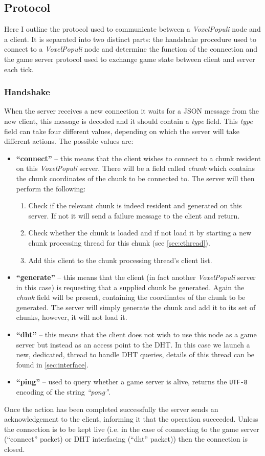 \documentclass[12pt,notitlepage,a4paper]{report}
\newcommand{\voxpop}{\emph{VoxelPopuli}}
\begin{document}
	\subsection{Protocol}
	Here I outline the protocol used to communicate between a \voxpop{} node and a client. It is separated into two distinct parts: the handshake procedure used to connect to a \voxpop{} node and determine the function of the connection and the game server protocol used to exchange game state between client and server each tick.
	\subsubsection{Handshake}
	\label{sec:handshake}
	When the server receives a new connection it waits for a JSON message from the new client, this message is decoded and it should contain a \emph{type} field. This \emph{type} field can take four different values, depending on which the server will take different actions. The possible values are:
	\begin{itemize}
		\item \textbf{``connect''} -- this means that the client wishes to connect to a chunk resident on this \voxpop{} server. There will be a field called \emph{chunk} which contains the chunk coordinates of the chunk to be connected to. The server will then perform the following:
		\begin{enumerate}
			\item Check if the relevant chunk is indeed resident and generated on this server. If not it will send a failure message to the client and return.
			\item Check whether the chunk is loaded and if not load it by starting a new chunk processing thread for this chunk (see \cref{sec:cthread}).
			\item Add this client to the chunk processing thread's client list.
		\end{enumerate}
		\item \textbf{``generate''} -- this means that the client (in fact another \voxpop{} server in this case) is requesting that a supplied chunk be generated. Again the \emph{chunk} field will be present, containing the coordinates of the chunk to be generated. The server will simply generate the chunk and add it to its set of chunks, however, it will not load it.
		\item \textbf{``dht''} -- this means that the client does not wish to use this node as a game server but instead as an access point to the DHT. In this case we launch a new, dedicated, thread to handle DHT queries, details of this thread can be found in \cref{sec:interface}.
		\item \textbf{``ping''} -- used to query whether a game server is alive, returns the \texttt{UTF-8} encoding of the string \emph{``pong''}.
	\end{itemize}
	Once the action has been completed successfully the server sends an acknowledgement to the client, informing it that the operation succeeded. Unless the connection is to be kept live (i.e. in the case of connecting to the game server (``connect'' packet) or DHT interfacing (``dht'' packet)) then the connection is closed.
	
\end{document}
